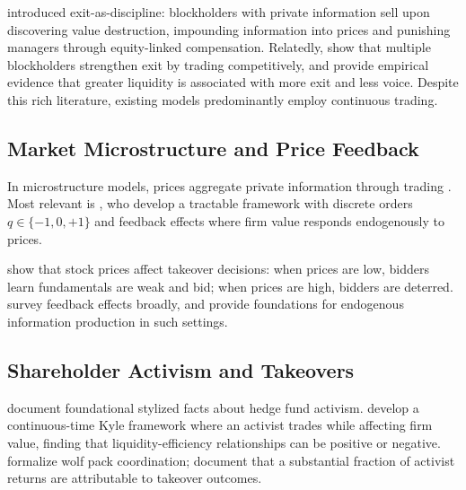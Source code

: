 \documentclass[11pt]{article}
\newcommand{\1}{\mathbf{1}}
\begin{document}
\citet{Edmans2009} introduced exit-as-discipline: blockholders with private information sell upon discovering value destruction, impounding information into prices and punishing managers through equity-linked compensation. Relatedly, \citet{EdmansManso2011} show that multiple blockholders strengthen exit by trading competitively, and \citet{EdmansFangZur2013} provide empirical evidence that greater liquidity is associated with more exit and less voice. Despite this rich literature, existing models predominantly employ continuous trading.

\subsection{Market Microstructure and Price Feedback}

In microstructure models, prices aggregate private information through trading \citep{Kyle1985,GlostenMilgrom1985}. Most relevant is \citet{EdmansGoldsteinJiang2015}, who develop a tractable framework with discrete orders $q \in \{-1, 0, +1\}$ and feedback effects where firm value responds endogenously to prices.

\citet{EdmansGoldsteinJiang2012} show that stock prices affect takeover decisions: when prices are low, bidders learn fundamentals are weak and bid; when prices are high, bidders are deterred. \citet{BondEdmansGoldstein2012} survey feedback effects broadly, and \citet{DowGoldsteinGuembel2017} provide foundations for endogenous information production in such settings.

\subsection{Shareholder Activism and Takeovers}

\citet{BravJiangPartnoyThomas2008} document foundational stylized facts about hedge fund activism. \citet{BackEtAl2018} develop a continuous-time Kyle framework where an activist trades while affecting firm value, finding that liquidity-efficiency relationships can be positive or negative. \citet{BravDasguptaMathews2022} formalize wolf pack coordination; \citet{GreenwoodSchor2009} document that a substantial fraction of activist returns are attributable to takeover outcomes.
\end{document}
